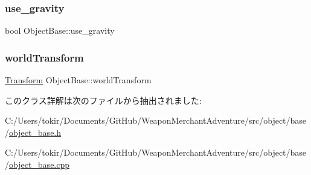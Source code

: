 \mbox{\label{class_object_base_aab135a2a04e76046804f01b63df4f35c}} 
\subsubsection{\texorpdfstring{use\+\_\+gravity}{use\_gravity}}
{\footnotesize\ttfamily bool Object\+Base\+::use\+\_\+gravity}

\mbox{\label{class_object_base_abedc2ea4baa694611f8822ea6e04b210}} 
\subsubsection{\texorpdfstring{world\+Transform}{worldTransform}}
{\footnotesize\ttfamily \mbox{\hyperlink{class_transform}{Transform}} Object\+Base\+::world\+Transform\hspace{0.3cm}{\ttfamily [protected]}}



このクラス詳解は次のファイルから抽出されました\+:\begin{DoxyCompactItemize}
\item 
C\+:/\+Users/tokir/\+Documents/\+Git\+Hub/\+Weapon\+Merchant\+Adventure/src/object/base/\mbox{\hyperlink{object__base_8h}{object\+\_\+base.\+h}}\item 
C\+:/\+Users/tokir/\+Documents/\+Git\+Hub/\+Weapon\+Merchant\+Adventure/src/object/base/\mbox{\hyperlink{object__base_8cpp}{object\+\_\+base.\+cpp}}\end{DoxyCompactItemize}
